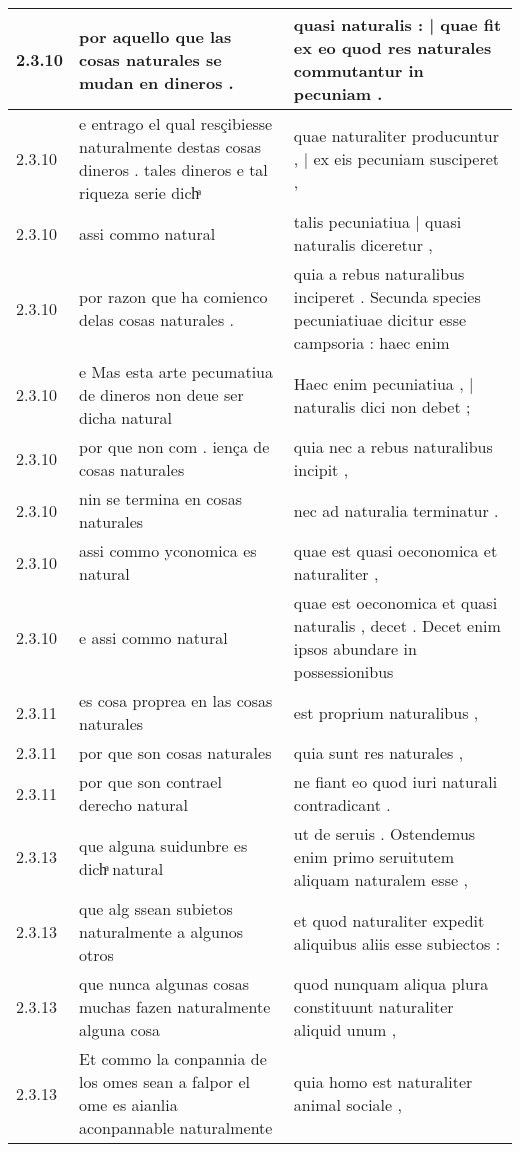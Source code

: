 \begin{tabular}{|p{1cm}|p{6.5cm}|p{6.5cm}|}
2.3.10 & por aquello que las cosas naturales se mudan en dineros . & quasi naturalis : | quae fit ex eo quod res naturales commutantur in pecuniam . \\\hline
2.3.10 & e entrago el qual resçibiesse naturalmente destas cosas dineros . tales dineros e tal riqueza serie dichͣ & quae naturaliter producuntur , | ex eis pecuniam susciperet , \\\hline
2.3.10 & assi commo natural & talis pecuniatiua | quasi naturalis diceretur , \\\hline
2.3.10 & por razon que ha comienco delas cosas naturales . & quia a rebus naturalibus inciperet . Secunda species pecuniatiuae dicitur esse campsoria : haec enim \\\hline
2.3.10 & e Mas esta arte pecumatiua de dineros non deue ser dicha natural & Haec enim pecuniatiua , | naturalis dici non debet ; \\\hline
2.3.10 & por que non com . iença de cosas naturales & quia nec a rebus naturalibus incipit , \\\hline
2.3.10 & nin se termina en cosas naturales & nec ad naturalia terminatur . \\\hline
2.3.10 & assi commo yconomica es natural & quae est quasi oeconomica et naturaliter , \\\hline
2.3.10 & e assi commo natural & quae est oeconomica et quasi naturalis , decet . Decet enim ipsos abundare in possessionibus \\\hline
2.3.11 & es cosa proprea en las cosas naturales & est proprium naturalibus , \\\hline
2.3.11 & por que son cosas naturales & quia sunt res naturales , \\\hline
2.3.11 & por que son contrael derecho natural & ne fiant eo quod iuri naturali contradicant . \\\hline
2.3.13 & que alguna suidunbre es dichͣ natural & ut de seruis . Ostendemus enim primo seruitutem aliquam naturalem esse , \\\hline
2.3.13 & que alg ssean subietos naturalmente a algunos otros & et quod naturaliter expedit aliquibus aliis esse subiectos : \\\hline
2.3.13 & que nunca algunas cosas muchas fazen naturalmente alguna cosa & quod nunquam aliqua plura constituunt naturaliter aliquid unum , \\\hline
2.3.13 & Et commo la conpannia de los omes sean a falpor el ome es aianlia aconpannable naturalmente & quia homo est naturaliter animal sociale , \\\hline

\end{tabular}
